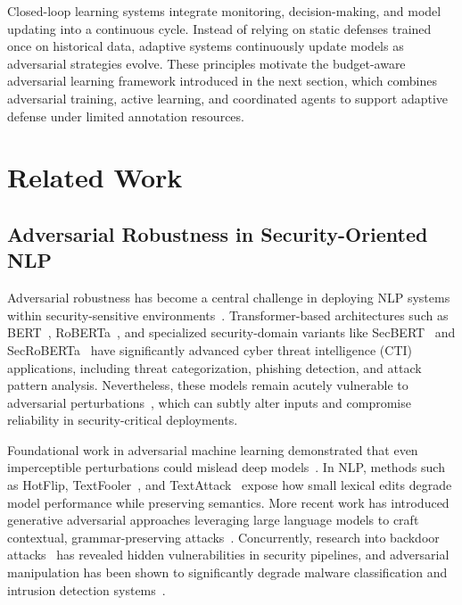 \documentclass[review,1p,times,number]{elsarticle}
\begin{document}
Closed-loop learning systems integrate monitoring, decision-making,
and model updating into a continuous cycle. Instead of relying on
static defenses trained once on historical data, adaptive systems
continuously update models as adversarial strategies evolve. These
principles motivate the budget-aware adversarial learning framework
introduced in the next section, which combines adversarial training,
active learning, and coordinated agents to support adaptive defense
under limited annotation resources.

\fi

\section{Related Work}
\label{sec:related}

\subsection{Adversarial Robustness in Security-Oriented NLP}

Adversarial robustness has become a central challenge in deploying NLP
systems within security-sensitive environments~\cite{goyal2023survey}.
Transformer-based architectures such as BERT~\cite{devlin2019bert},
RoBERTa~\cite{liu2019roberta}, and specialized security-domain variants like
SecBERT~\cite{secbert2022} and SecRoBERTa~\cite{secroberta2022} have significantly advanced cyber threat
intelligence (CTI) applications, including threat categorization,
phishing detection, and attack pattern analysis. Nevertheless, these
models remain acutely vulnerable to adversarial
perturbations~\cite{khamaiseh2022adversarial}, which can subtly alter
inputs and compromise reliability in security-critical deployments.

Foundational work in adversarial machine learning demonstrated that even
imperceptible perturbations could mislead deep
models~\cite{goodfellow2015explaining, madry2018towards}. In NLP,
methods such as HotFlip, TextFooler~\cite{jin2020bert}, and
TextAttack~\cite{morris2020textattack} expose how small lexical edits
degrade model performance while preserving semantics. More recent work
has introduced generative adversarial approaches leveraging large
language models to craft contextual, grammar-preserving
attacks~\cite{madrueno2025adversarial}. Concurrently, research into
backdoor attacks~\cite{shao2022backdoor} has revealed hidden
vulnerabilities in security pipelines, and adversarial manipulation
has been shown to significantly degrade malware classification and
intrusion detection systems~\cite{jafari2026adversarialdefense}.
\end{document}
